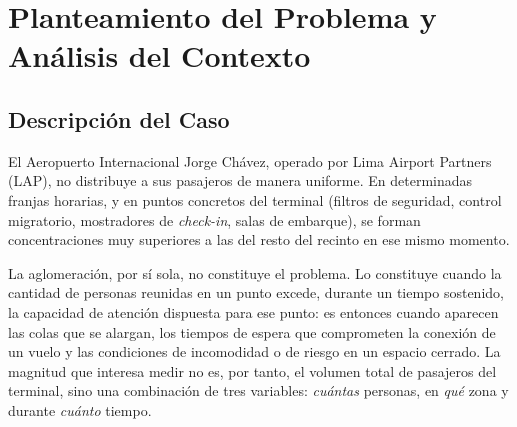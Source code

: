 %
%
\section{Planteamiento del Problema y Análisis del Contexto}
\label{sec:planteamiento}

\subsection{Descripción del Caso}
\label{sec:contexto}

El Aeropuerto Internacional Jorge Chávez, operado por Lima Airport
Partners (LAP), no distribuye a sus pasajeros de manera uniforme. En
determinadas franjas horarias, y en puntos concretos del terminal
(filtros de seguridad, control migratorio, mostradores de
\emph{check-in}, salas de embarque), se forman concentraciones muy
superiores a las del resto del recinto en ese mismo momento.

La aglomeración, por sí sola, no constituye el problema. Lo constituye
cuando la cantidad de personas reunidas en un punto excede, durante un
tiempo sostenido, la capacidad de atención dispuesta para ese punto: es
entonces cuando aparecen las colas que se alargan, los tiempos de espera
que comprometen la conexión de un vuelo y las condiciones de
incomodidad o de riesgo en un espacio cerrado. La magnitud que interesa
medir no es, por tanto, el volumen total de pasajeros del terminal, sino
una combinación de tres variables: \emph{cuántas} personas, en
\emph{qué} zona y durante \emph{cuánto} tiempo.

